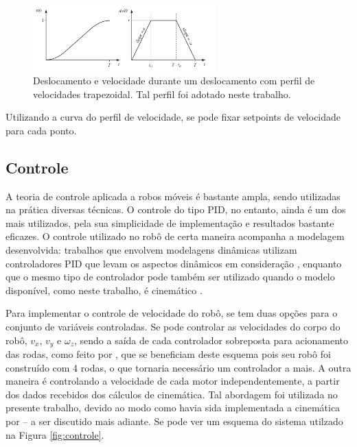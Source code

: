 \begin{figure}[h]
  \centering
  \includegraphics[width = 0.63\textwidth]{imagens/trapezoidal}
  \caption{Deslocamento e velocidade durante um deslocamento com perfil de velocidades trapezoidal. Tal perfil foi adotado neste trabalho.}
  \label{fig:trap}
\end{figure}

Utilizando a curva do perfil de velocidade, se pode fixar setpoints de velocidade para cada ponto.

\subsection{Controle}

A teoria de controle aplicada a robos móveis é bastante ampla, sendo utilizadas na prática diversas técnicas. O controle do tipo PID, no entanto, ainda é um dos mais utilizados, pela sua simplicidade de implementação e resultados bastante eficazes. O controle utilizado no robô de certa maneira acompanha a modelagem desenvolvida: trabalhos que envolvem modelagens dinâmicas utilizam controladores PID que levam os aspectos dinâmicos em consideração \citep{samani2007comprehensive}, enquanto que o mesmo tipo de controlador pode também ser utilizado quando o modelo disponível, como neste trabalho, é cinemático \citep{indiveri2009swedish}.

Para implementar o controle de velocidade do robô, se tem duas opções para o conjunto de variáveis controladas. Se pode controlar as velocidades do corpo do robô, $v_x$, $v_y$ e $\omega_z$, sendo a saída de cada controlador sobreposta para acionamento das rodas, como feito por \citet{rojas2006holonomic}, que se beneficiam deste esquema pois seu robô foi construído com 4 rodas, o que tornaria necessário um controlador a mais. A outra maneira é controlando a velocidade de cada motor independentemente, a partir dos dados recebidos dos cálculos de cinemática. Tal abordagem foi utilizada no presente trabalho, devido ao modo como havia sida implementada a cinemática por \cite{ritter2016modelagem} -- a ser discutido mais adiante. Se pode ver um esquema do sistema utilzado na Figura \ref{fig:controle}.

